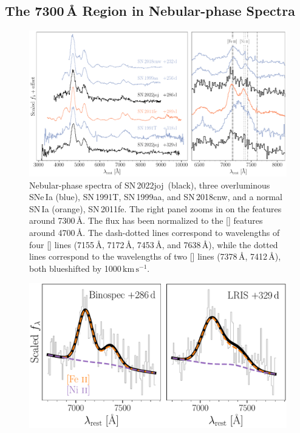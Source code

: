 \documentclass[twocolumn]{aastex631}
\newcommand{\sn}{SN\,2022joj}
\newcommand{\kms}{$\mathrm{km}\,\mathrm{s}^{-1}$}
\begin{document}
\begin{CJK*}{UTF8}{gbsn}
\subsection{The 7300\,\r{A} Region in Nebular-phase Spectra}
\label{sec:disc_nebular}
\begin{figure}
    \centering
    \includegraphics[width=\linewidth]{spec_comp_nebular.pdf}
    \caption{Nebular-phase spectra of \sn\ (black), three overluminous SNe\,Ia (blue), SN\,1991T, SN\,1999aa, and SN\,2018cnw, and a normal SN\,Ia (orange), SN\,2011fe. The right panel zooms in on the features around 7300\,\r{A}. The flux has been normalized to the [] features around 4700\,\r{A}. The dash-dotted lines correspond to wavelengths of four [] lines (7155\,\r{A}, 7172\,\r{A}, 7453\,\r{A}, and 7638\,\r{A}), while the dotted lines correspond to the wavelengths of two [] lines (7378\,\r{A}, 7412\,\r{A}), both blueshifted by 1000\,\kms.}
    \label{fig:nebular_spec}
\end{figure}
\begin{figure}
    \centering
    \includegraphics[width=\linewidth]{Fe_Ni.pdf}

\end{figure}
\end{CJK*}
\end{document}

